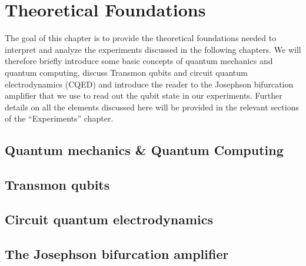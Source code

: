 \chapter{Theoretical Foundations}

The goal of this chapter is to provide the theoretical foundations needed to interpret and analyze the experiments discussed in the following chapters. We will therefore briefly introduce some basic concepts of quantum mechanics and quantum computing, discuss Transmon qubits and circuit quantum electrodynamics (CQED) and introduce the reader to the Josephson bifurcation amplifier that we use to read out the qubit state in our experiments. Further details on all the elements discussed here will be provided in the relevant sections of the ``Experiments'' chapter.

\section{Quantum mechanics \& Quantum Computing}

\section{Transmon qubits}

\section{Circuit quantum electrodynamics}

\section{The Josephson bifurcation amplifier}
